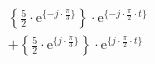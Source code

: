 \[
\begin{split}
&   \left \{ \frac{5}{2} \cdot \textrm{e}^{\{ -j \cdot \frac{\pi}{3} \}} \right \} \cdot \textrm{e}^{\{- j \cdot \frac{\pi}{2} \cdot t \}}\\
&+  \left \{ \frac{5}{2} \cdot \textrm{e}^{\{  j \cdot \frac{\pi}{3} \}} \right \} \cdot \textrm{e}^{\{  j \cdot \frac{\pi}{2} \cdot t \}}\\
\end{split}
\]
